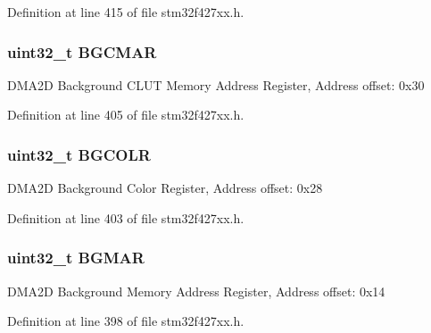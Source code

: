 Definition at line 415 of file stm32f427xx.\+h.

\subsubsection[{\texorpdfstring{B\+G\+C\+M\+AR}{BGCMAR}}]{ uint32\+\_\+t B\+G\+C\+M\+AR}\hypertarget{struct_d_m_a2_d___type_def_a8108e797e9421f12d2fa5b7bca1d8a12}{}\label{struct_d_m_a2_d___type_def_a8108e797e9421f12d2fa5b7bca1d8a12}
D\+M\+A2D Background C\+L\+UT Memory Address Register, Address offset\+: 0x30 

Definition at line 405 of file stm32f427xx.\+h.

\subsubsection[{\texorpdfstring{B\+G\+C\+O\+LR}{BGCOLR}}]{ uint32\+\_\+t B\+G\+C\+O\+LR}\hypertarget{struct_d_m_a2_d___type_def_a1b655471716402cff4ef1d584da01ea6}{}\label{struct_d_m_a2_d___type_def_a1b655471716402cff4ef1d584da01ea6}
D\+M\+A2D Background Color Register, Address offset\+: 0x28 

Definition at line 403 of file stm32f427xx.\+h.

\subsubsection[{\texorpdfstring{B\+G\+M\+AR}{BGMAR}}]{ uint32\+\_\+t B\+G\+M\+AR}\hypertarget{struct_d_m_a2_d___type_def_a2ab8fa08f05f63b322b38013283e6fa0}{}\label{struct_d_m_a2_d___type_def_a2ab8fa08f05f63b322b38013283e6fa0}
D\+M\+A2D Background Memory Address Register, Address offset\+: 0x14 

Definition at line 398 of file stm32f427xx.\+h.

